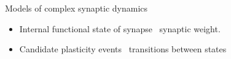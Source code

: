 \documentclass{beamer}%
\begin{document}
\begin{frame}{Models of complex synaptic dynamics}
%
  \begin{itemize}
    \item Internal functional state of synapse \lto\ synaptic weight.
    \item Candidate plasticity events \lto\ transitions between states
  \end{itemize}
  \begin{center}
  \end{center}


  \vp


\end{frame}
\end{document}
